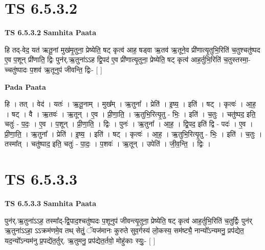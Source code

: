 \documentclass[17pt]{extarticle}
\begin{document}
\section*{ TS 6.5.3.2 }

\textbf{TS 6.5.3.2 } \newline
\textbf{Samhita Paata} \newline

हि तद्-वेद॒ यत॑ ऋतू॒नां मुख॑मृ॒तुना॒ प्रेष्येति॒ षट् कृत्व॑ आह॒ षड्वा ऋ॒तव॑ ऋ॒तूने॒व प्री॑णात्यृ॒तुभि॒रिति॑ च॒तुश्चतु॑ष्पद ए॒व प॒शून् प्री॑णाति॒ द्विः पुन॑र्.ऋ॒तुना॑ऽऽह द्वि॒पद॑ ए॒व प्री॑णात्यृ॒तुना॒ प्रेष्येति॒ षट् कृत्व॑ आह॒र्तुभि॒रिति॑ च॒तुस्तस्मा॒-च्चतु॑ष्पादः प॒शव॑ ऋ॒तूनुप॑ जीवन्ति॒ द्विः- [  ] \newline

\textbf{Pada Paata} \newline

हि । तत् । वेद॑ । यतः॑ । ऋ॒तू॒नाम् । मुख᳚म् । ऋ॒तुना᳚ । प्रेति॑ । इ॒ष्य॒ । इति॑ । षट् । कृत्वः॑ । आ॒ह॒ । षट् । वै । ऋ॒तवः॑ । ऋ॒तून् । ए॒व । प्री॒णा॒ति॒ । ऋ॒तुभि॒रित्यृ॒तु - भिः॒ । इति॑ । च॒तुः । चतु॑ष्पद॒ इति॒ चतुः॑ - प॒दः॒ । ए॒व । प॒शून् । प्री॒णा॒ति॒ । द्विः । पुनः॑ । ऋ॒तुना᳚ । आ॒ह॒ । द्वि॒पद॒ इति॑ द्वि - पदः॑ । ए॒व । प्री॒णा॒ति॒ । ऋ॒तुना᳚ । प्रेति॑ । इ॒ष्य॒ । इति॑ । षट् । कृत्वः॑ । आ॒ह॒ । ऋ॒तुभि॒रित्यृ॒तु - भिः॒ । इति॑ । च॒तुः । तस्मा᳚त् । चतु॑ष्पाद॒ इति॒ चतुः॑ - पा॒दः॒ । प॒शवः॑ । ऋ॒तून् । उपेति॑ । जी॒व॒न्ति॒ । द्विः ।  \newline




\section*{ TS 6.5.3.3 }

\textbf{TS 6.5.3.3 } \newline
\textbf{Samhita Paata} \newline

पुन॑र्.ऋ॒तुना॑ऽऽह॒ तस्मा᳚द्-द्वि॒पाद॒श्चतु॑ष्पदः प॒शूनुप॑ जीवन्त्यृ॒तुना॒ प्रेष्येति॒ षट् कृत्व॑ आह॒र्तुभि॒रिति॑ च॒तुर्द्विः पुन॑र् ऋ॒तुना॑ऽऽहा॒ ऽऽक्रम॑णमे॒व तथ् सेतुं॒ ॅयज॑मानः कुरुते सुव॒र्गस्य॑ लो॒कस्य॒ सम॑ष्ट्यै॒ नान्यो᳚ऽन्यमनु॒ प्रप॑द्येत॒ यद॒न्यो᳚ऽन्यम॑नु प्र॒पद्ये॑त॒र्तुर्. ऋ॒तुमनु॒ प्रप॑द्येत॒र्तवो॒ मोहु॑काः स्युः॒- [  ] \newline
\end{document}
